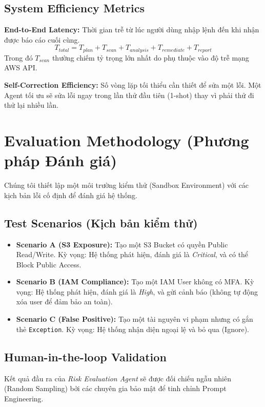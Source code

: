\subsection{System Efficiency Metrics}

\textbf{End-to-End Latency:}
Thời gian trễ từ lúc người dùng nhập lệnh đến khi nhận được báo cáo cuối cùng.
\[
T_{total} = T_{plan} + T_{scan} + T_{analysis} + T_{remediate} + T_{report}
\]
Trong đó $T_{scan}$ thường chiếm tỷ trọng lớn nhất do phụ thuộc vào độ trễ mạng AWS API.

\textbf{Self-Correction Efficiency:}
Số vòng lặp tối thiểu cần thiết để sửa một lỗi. Một Agent tối ưu sẽ sửa lỗi ngay trong lần thử đầu tiên (1-shot) thay vì phải thử đi thử lại nhiều lần.

\section{Evaluation Methodology (Phương pháp Đánh giá)}

Chúng tôi thiết lập một môi trường kiểm thử (Sandbox Environment) với các kịch bản lỗi cố định để đánh giá hệ thống.

\subsection{Test Scenarios (Kịch bản kiểm thử)}
\begin{itemize}
    \item \textbf{Scenario A (S3 Exposure):} Tạo một S3 Bucket có quyền Public Read/Write. Kỳ vọng: Hệ thống phát hiện, đánh giá là \textit{Critical}, và có thể Block Public Access.
    \item \textbf{Scenario B (IAM Compliance):} Tạo một IAM User không có MFA. Kỳ vọng: Hệ thống phát hiện, đánh giá là \textit{High}, và gửi cảnh báo (không tự động xóa user để đảm bảo an toàn).
    \item \textbf{Scenario C (False Positive):} Tạo một tài nguyên vi phạm nhưng có gắn thẻ \texttt{Exception}. Kỳ vọng: Hệ thống nhận diện ngoại lệ và bỏ qua (Ignore).
\end{itemize}

\subsection{Human-in-the-loop Validation}
Kết quả đầu ra của \textit{Risk Evaluation Agent} sẽ được đối chiếu ngẫu nhiên (Random Sampling) bởi các chuyên gia bảo mật để tinh chỉnh Prompt Engineering.

